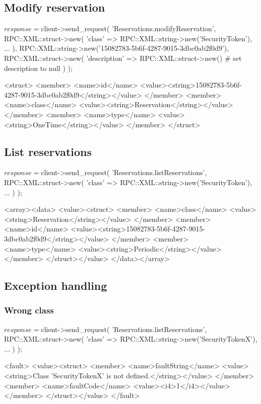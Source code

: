 \documentclass[a4paper]{report}
\begin{document}
\newpage
\subsection{Modify reservation}
\begin{PerlCmd}
$response = $client->send_request(
    'Reservations.modifyReservation',
    RPC::XML::struct->new(
        'class' => RPC::XML::string->new('SecurityToken'),
        ...
    ),
    RPC::XML::string->new('15082783-5b6f-4287-9015-3dbc0ab2f0d9'),
    RPC::XML::struct->new(
        'description' => RPC::XML::struct->new() # set description to null
    )
);
\end{PerlCmd}
\begin{PerlResponse}
<struct>
  <member>
    <name>id</name>
    <value><string>15082783-5b6f-4287-9015-3dbc0ab2f0d9</string></value>
  </member>
  <member>
    <name>class</name>
    <value><string>Reservation</string></value>
  </member>
  <member>
    <name>type</name>
    <value><string>OneTime</string></value>
  </member>
</struct>
\end{PerlResponse}

\newpage
\subsection{List reservations}
\begin{PerlCmd}
$response = $client->send_request(
    'Reservations.listReservations',
    RPC::XML::struct->new(
        'class' => RPC::XML::string->new('SecurityToken'),
        ...
    )
);
\end{PerlCmd}
\begin{PerlResponse}
<array><data>
  <value><struct>
    <member>
      <name>class</name>
      <value><string>Reservation</string></value>
    </member>
    <member>
      <name>id</name>
      <value><string>15082783-5b6f-4287-9015-3dbc0ab2f0d9</string></value>
    </member>
    <member>
      <name>type</name>
      <value><string>Periodic</string></value>
    </member>
  </struct></value>
</data></array>
\end{PerlResponse}

\newpage
\subsection{Exception handling}
\subsubsection{Wrong class}
\begin{PerlCmd}
$response = $client->send_request(
    'Reservations.listReservations',
    RPC::XML::struct->new(
        'class' => RPC::XML::string->new('SecurityTokenX'),
        ...
    )
);
\end{PerlCmd}
\begin{PerlResponse}
<fault>
  <value><struct>
    <member>
      <name>faultString</name>
      <value><string>Class 'SecurityTokenX' is not defined.</string></value>
    </member>
    <member>
      <name>faultCode</name>
      <value><i4>1</i4></value>
    </member>
  </struct></value>
</fault>
\end{PerlResponse}
\end{document}
